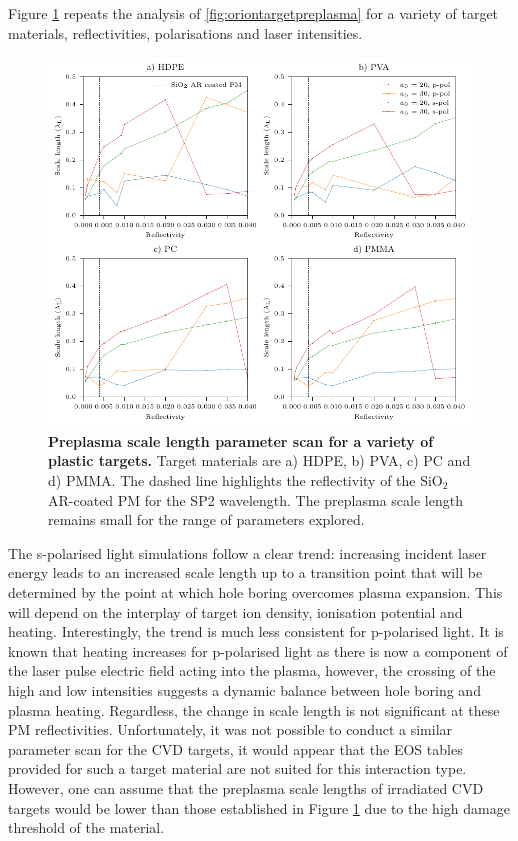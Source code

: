 Figure \ref{fig:orionscalelengthparameterscan} repeats the analysis of \ref{fig:oriontargetpreplasma} for a variety of target materials, reflectivities, polarisations and laser intensities.
\begin{figure}
	\centering
	\includegraphics{figures/orion/orion_scale_length_parameter_scan}
	\caption[Preplasma scale length parameter scan.]{\textbf{Preplasma scale length parameter scan for a variety of plastic targets.} Target materials are a) HDPE, b) PVA, c) PC and d) PMMA. The dashed line highlights the reflectivity of the SiO$_2$ AR-coated PM for the SP2 wavelength. The preplasma scale length remains small for the range of parameters explored.}
	\label{fig:orionscalelengthparameterscan}
\end{figure}
The s-polarised light simulations follow a clear trend: increasing incident laser energy leads to an increased scale length up to a transition point that will be determined by the point at which hole boring overcomes plasma expansion. This will depend on the interplay of target ion density, ionisation potential and heating. Interestingly, the trend is much less consistent for p-polarised light. It is known that heating increases for p-polarised light as there is now a component of the laser pulse electric field acting into the plasma, however, the crossing of the high and low intensities suggests a dynamic balance between hole boring and plasma heating. Regardless, the change in scale length is not significant at these PM reflectivities. Unfortunately, it was not possible to conduct a similar parameter scan for the CVD targets, it would appear that the EOS tables provided for such a target material are not suited for this interaction type. However, one can assume that the preplasma scale lengths of irradiated CVD targets would be lower than those established in Figure \ref{fig:orionscalelengthparameterscan} due to the high damage threshold of the material. 

